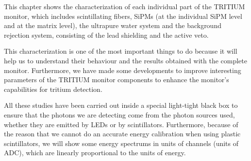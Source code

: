 This chapter shows the characterization of each individual part of the TRITIUM monitor, which includes scintillating fibers, SiPMs (at the individual SiPM level and at the matrix level), the ultrapure water system and the background rejection system, consisting of the lead shielding and the active veto. 

This characterization is one of the most important things to do because it will help us to understand their behaviour and the results obtained with the complete monitor. Furthermore, we have made some developments to improve interesting parameters of the TRITIUM monitor components to enhance the monitor's capabilities for tritium detection.

All these studies have been carried out inside a special light-tight black box to ensure that the photons we are detecting come from the photon sources used, whether they are emitted by LEDs or by scintillators. Furthermore, because of the reason that we cannot do an accurate energy calibration when using plastic scintillators, we will show some energy spectrums in units of channels (units of ADC), which are linearly proportional to the units of energy.
